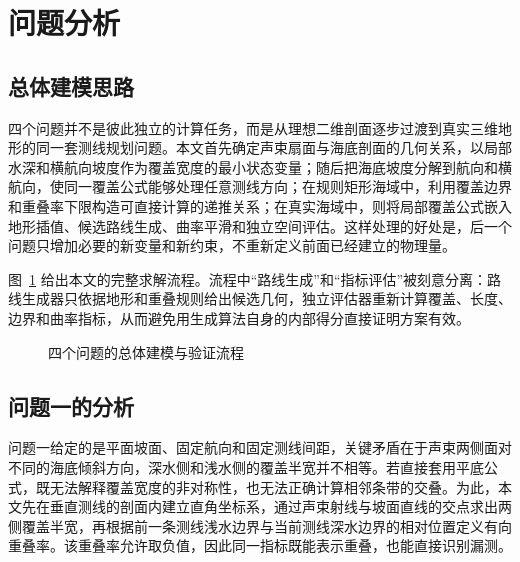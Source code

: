 \section{问题分析}
\subsection{总体建模思路}
四个问题并不是彼此独立的计算任务，而是从理想二维剖面逐步过渡到真实三维地形的同一套测线规划问题。本文首先确定声束扇面与海底剖面的几何关系，以局部水深和横航向坡度作为覆盖宽度的最小状态变量；随后把海底坡度分解到航向和横航向，使同一覆盖公式能够处理任意测线方向；在规则矩形海域中，利用覆盖边界和重叠率下限构造可直接计算的递推关系；在真实海域中，则将局部覆盖公式嵌入地形插值、候选路线生成、曲率平滑和独立空间评估。这样处理的好处是，后一个问题只增加必要的新变量和新约束，不重新定义前面已经建立的物理量。

图~\ref{fig:flow} 给出本文的完整求解流程。流程中“路线生成”和“指标评估”被刻意分离：路线生成器只依据地形和重叠规则给出候选几何，独立评估器重新计算覆盖、长度、边界和曲率指标，从而避免用生成算法自身的内部得分直接证明方案有效。

\begin{figure}[H]
\centering
{}
\caption{四个问题的总体建模与验证流程}
\label{fig:flow}
\end{figure}

\subsection{问题一的分析}
问题一给定的是平面坡面、固定航向和固定测线间距，关键矛盾在于声束两侧面对不同的海底倾斜方向，深水侧和浅水侧的覆盖半宽并不相等。若直接套用平底公式，既无法解释覆盖宽度的非对称性，也无法正确计算相邻条带的交叠。为此，本文先在垂直测线的剖面内建立直角坐标系，通过声束射线与坡面直线的交点求出两侧覆盖半宽，再根据前一条测线浅水边界与当前测线深水边界的相对位置定义有向重叠率。该重叠率允许取负值，因此同一指标既能表示重叠，也能直接识别漏测。

